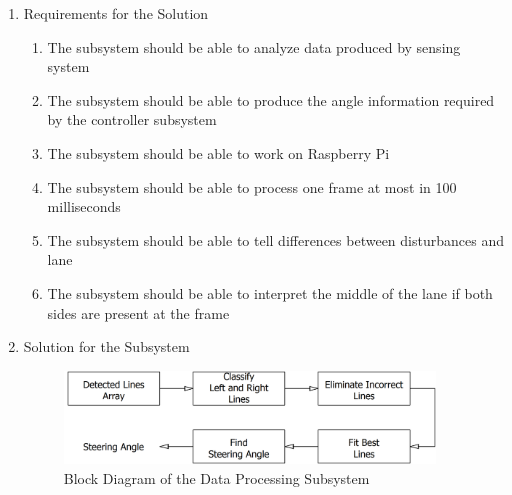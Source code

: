 \documentclass[a4paper,12pt]{article}
\begin{document}
\begin{enumerate}

\item {Requirements for the Solution}


\begin{enumerate}

\item The subsystem should be able to analyze data produced by sensing system

\item The subsystem should be able to produce the angle information required by the controller subsystem

\item The subsystem should be able to work on Raspberry Pi

\item The subsystem should be able to process one frame at most in 100 milliseconds

\item The subsystem should be able to tell differences between disturbances and lane

\item The subsystem should be able to interpret the middle of the lane if both sides are present at the frame

\end{enumerate}


\item {Solution for the Subsystem}

\begin{figure}[h]

\includegraphics[width=0.93\textwidth,center]{images/vModels/dataProcessing_subsystem}

\caption{Block Diagram of the Data Processing Subsystem}\label{fig:dataProcessing_subsystem}

\end{figure}




\end{enumerate}
\end{document}
